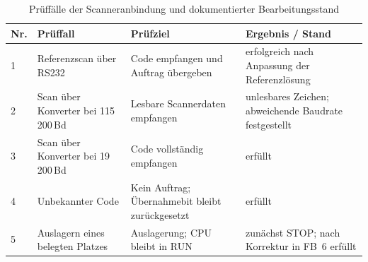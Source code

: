 \begin{table}[htbp]
  \centering
  \caption{Prüffälle der Scanneranbindung und dokumentierter Bearbeitungsstand}
  \label{tab:qr_test}
  \small
  \begin{tabular}{|p{}|p{}|p{}|p{}|}
    \hline
    {\raggedright \textbf{Nr.}\par} & {\raggedright \textbf{Prüffall}\par} & {\raggedright \textbf{Prüfziel}\par} & {\raggedright \textbf{Ergebnis / Stand}\par} \\ \hline
    {\raggedright 1\par} & {\raggedright Referenzscan über RS232\par} & {\raggedright Code empfangen und Auftrag übergeben\par} & {\raggedright erfolgreich nach Anpassung der Referenzlösung\par} \\ \hline
    {\raggedright 2\par} & {\raggedright Scan über Konverter bei 115\,200\,Bd\par} & {\raggedright Lesbare Scannerdaten empfangen\par} & {\raggedright unlesbares Zeichen; abweichende Baudrate festgestellt\par} \\ \hline
    {\raggedright 3\par} & {\raggedright Scan über Konverter bei 19\,200\,Bd\par} & {\raggedright Code vollständig empfangen\par} & {\raggedright erfüllt\par} \\ \hline
    {\raggedright 4\par} & {\raggedright Unbekannter Code\par} & {\raggedright Kein Auftrag; Übernahmebit bleibt zurückgesetzt\par} & {\raggedright erfüllt\par} \\ \hline
    {\raggedright 5\par} & {\raggedright Auslagern eines belegten Platzes\par} & {\raggedright Auslagerung; CPU bleibt in RUN\par} & {\raggedright zunächst STOP; nach Korrektur in FB~6 erfüllt\par} \\ \hline

\end{tabular}
\end{table}
